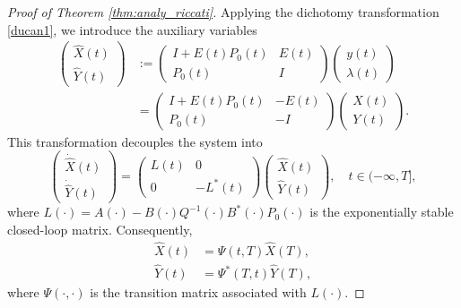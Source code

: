 \documentclass{IEEEtran}
\begin{document}
\begin{proof}[Proof of Theorem \ref{thm:analy_riccati}]
		Applying the dichotomy transformation \eqref{ducan1}, we introduce the auxiliary variables
		\begin{equation*}
			\begin{aligned}
				\begin{pmatrix} \hat{X}(t) \\ \hat{Y}(t) \end{pmatrix} &:= 
				\begin{pmatrix}
					I+E(t)P_0(t) & E(t)\\
					P_0(t) & I
				\end{pmatrix}
				\begin{pmatrix} y(t) \\ \lambda(t) \end{pmatrix}\\
				&=
				\begin{pmatrix}
					I+E(t)P_0(t) & -E(t)\\
					P_0(t) & -I
				\end{pmatrix}
				\begin{pmatrix} X(t) \\ Y(t) \end{pmatrix}.
			\end{aligned}
		\end{equation*}
		This transformation decouples the system into
		\begin{equation*}
			\begin{pmatrix} \dot{\hat{X}}(t)\\ \dot{\hat{Y}}(t) \end{pmatrix}
			=
			\begin{pmatrix}
				L(t) & 0 \\
				0 & -L^*(t)
			\end{pmatrix}
			\begin{pmatrix} \hat{X}(t)\\ \hat{Y}(t) \end{pmatrix},\quad t\in(-\infty,T],
		\end{equation*}
		where $L(\cdot)=A(\cdot)-B(\cdot)Q^{-1}(\cdot)B^*(\cdot)P_0(\cdot)$ is the exponentially stable closed-loop matrix. Consequently,
		\begin{equation}
			\begin{aligned}
				\hat{X}(t) &= \Psi(t,T)\hat{X}(T), \\
				\hat{Y}(t) &= \Psi^*(T,t)\hat{Y}(T),
			\end{aligned}
		\end{equation}
		where $\Psi(\cdot,\cdot)$ is the transition matrix associated with $L(\cdot)$. 
		

\end{proof}
\end{document}
